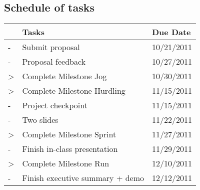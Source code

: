 \documentclass{article}
\begin{document}
\subsection{Schedule of tasks}
\begin{tabular}{|l|l|l|}
\hline
  & Tasks                             & Due Date   \\ \hline
- & Submit proposal                   & 10/21/2011 \\
- & Proposal feedback                 & 10/27/2011 \\
> & Complete Milestone Jog            & 10/30/2011 \\
> & Complete Milestone Hurdling       & 11/15/2011 \\
- & Project checkpoint                & 11/15/2011 \\
- & Two slides                        & 11/22/2011 \\
> & Complete Milestone Sprint         & 11/27/2011 \\
- & Finish in-class presentation      & 11/29/2011 \\
> & Complete Milestone Run            & 12/10/2011 \\
- & Finish executive summary + demo   & 12/12/2011 \\
\hline
\end{tabular}
\end{document}

